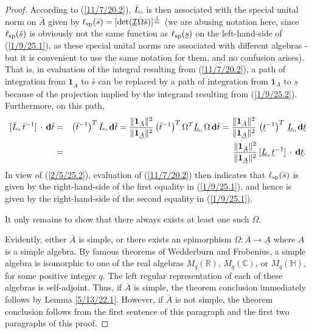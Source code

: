 \documentclass{amsart}
\theoremstyle{definition}
\numberwithin{theorem}{section}
\numberwithin{equation}{section}
\begin{document}
\begin{proof}
  According to (\ref{11/7/20.2}), $\bar{L}_{\shortparallel}$ is then associated with the special unital norm on $\bar{A}$ given by $\ell_{\rm sp}(\bar{s}) = [\text{det}(\underline{\mathcal{I}}\Omega\bar{s})]^{\frac{1}{m}}$ (we are abusing notation here, since $\ell_{\rm sp}(\bar{s})$ is obviously not the same function as $\ell_{\rm sp}(\underline{s})$ on the left-hand-side of (\ref{1/9/25.1}), as these special unital norms are associated with different algebras - but it is convenient to use the same notation for them, and no confusion arises).  That is, in evaluation of the integral resulting from  (\ref{11/7/20.2}), a path of integration from $\mathbf{1}_{\bar{A}}$ to $\bar{s}$ can be replaced by a path of integration from $\mathbf{1}_{\underline{A}}$ to $\underline{s}$ because of the projection implied by the integrand resulting from (\ref{1/9/25.2}).   Furthermore, on this path,
  \begin{eqnarray}\nonumber  [\bar{L}_{\shortparallel}\,\bar{t}^{-1}]\,\cdot\, \mathbf{d}\bar{t} &=& \left(\bar{t}^{-1}\right)^T \bar{L}_{\shortparallel}\,\mathbf{d}\bar{t} =  \frac{\|\mathbf{1}_{\bar{A}}\|^2}{\|\mathbf{1}_{\underline{A}}\|^2}\left(\bar{t}^{-1}\right)^T \Omega^T \underline{L}_{\shortparallel} \, \Omega \, \mathbf{d}\bar{t}  = \frac{\|\mathbf{1}_{\bar{A}}\|^2}{\|\mathbf{1}_{\underline{A}}\|^2}\,\left(\underline{t}^{-1}\right)^T\, \underline{L}_{\shortparallel}\,\mathbf{d}\underline{t} \\ &=& \frac{\|\mathbf{1}_{\bar{A}}\|^2}{\|\mathbf{1}_{\underline{A}}\|^2}\,[\underline{L}_{\shortparallel}\,\underline{t}^{-1}]\,\cdot\, \mathbf{d}\underline{t}.\label{2/5/25.2}\end{eqnarray}   In view of (\ref{2/5/25.2}), evaluation of (\ref{11/7/20.2}) then indicates that $\ell_{\rm sp}(\bar{s})$ is given by the right-hand-side of the first equality in (\ref{1/9/25.1}), and hence is given by the right-hand-side of the second equality in (\ref{1/9/25.1}). 
  

  It only remains to show that there always exists at least one such $\Omega$. 
  
  Evidently, either $\bar{A}$ is simple, or there exists an epimorphism $\Omega:\bar{A}\rightarrow \underline{A}$ where $ \underline{A}$ is a simple algebra.   By famous theorems of Wedderburn and Frobenius, a simple algebra is isomorphic to one of the real algebras $M_q(\mathbb{R})$, $M_q(\mathbb{C})$, or $M_q(\mathbb{H})$, for some positive integer $q$.  The left regular representation of each of these algebras is self-adjoint.  Thus, if $\bar{A}$ is simple, the theorem conclusion immediately follows by Lemma \ref{5/13/22.1}.  However, if $\bar{A}$ is not simple, the theorem conclusion follows from the first sentence of this paragraph and the first two paragraphs of this proof.
  \end{proof}
\end{document}
